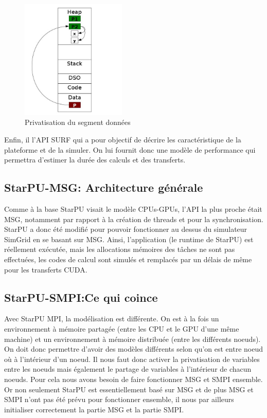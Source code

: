 \documentclass[smallextended]{svjour3}
\begin{document}
\begin{figure}[htb]
\centering
\includegraphics[width=5cm]{./Img/Memoire.jpg}
\caption{\label{fig:1}Privatisation du segment données}
\end{figure}

Enfin, il l'API SURF qui a pour objectif de décrire les
caractéristique de la plateforme et de la simuler. On lui fournit
donc une modèle de performance qui permettra d'estimer la durée des
calculs et des transferts.

\subsection{StarPU-MSG: Architecture générale}
\label{sec-3-2}
Comme à la base StarPU visait le modèle CPUs-GPUs, l'API la plus
proche était MSG, notamment par rapport à la création de threads et
pour la synchronisation. StarPU a donc été modifié pour pouvoir
fonctionner au dessus du simulateur SimGrid en se basant sur
MSG. Ainsi, l'application (le runtime de StarPU) est réellement
exécutée, mais les allocations mémoires des tâches ne sont pas
effectuées, les codes de calcul sont simulés et remplacés par un
délais de même pour les transferts CUDA. 


\subsection{StarPU-SMPI:Ce qui coince}
\label{sec-3-3}
Avec StarPU MPI, la modélisation est différente. On est à la fois
un environnement à mémoire partagée (entre les CPU et le GPU
d'une même machine) et un environnement à mémoire distribuée
(entre les différents noeuds). On doit donc permettre d'avoir des
modèles différents selon qu'on est entre noeud où à l'intérieur
d'un noeud. Il nous faut donc activer la privatisation de variables
entre les noeuds mais également le partage de variables à
l'intérieur de chacun noeuds. Pour cela nous avons besoin de faire
fonctionner MSG et SMPI ensemble. Or non seulement StarPU est
essentiellement basé sur MSG et de plus MSG et SMPI n'ont pas été
prévu pour fonctionner ensemble, il nous par ailleurs initialiser
correctement la partie MSG et la partie SMPI.
\end{document}

